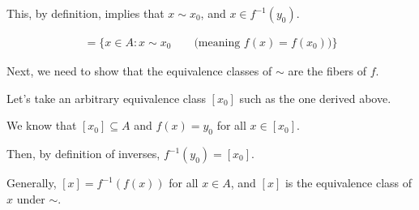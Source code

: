 \begin{Answer}
  \noindent
  This, by definition, implies that $x \sim x_0$, and $x \in f^{-1}(y_0)$.

  \begin{align*}
    [x_0] = \{x \in A \colon x \sim x_0\qquad \text{(meaning $f(x) = f(x_0)$)} \}
  \end{align*}

  \bigskip
  \noindent
  Next, we need to show that the equivalence classes of $\sim$ are the fibers of $f$.

  \noindent
  Let's take an arbitrary equivalence class $[x_0]$ such as the one derived above.

  \noindent
  We know that $[x_0] \subseteq A$ and $f(x) = y_0$ for all $x \in [x_0]$.

  \noindent
  Then, by definition of inverses, $f^{-1}(y_0) = [x_0]$.

  \noindent
  Generally,
  $[x] = f^{-1}(f(x))$ for all $x \in A$, and $[x]$ is the equivalence class of $x$ under $\sim$.

  
\end{Answer}
